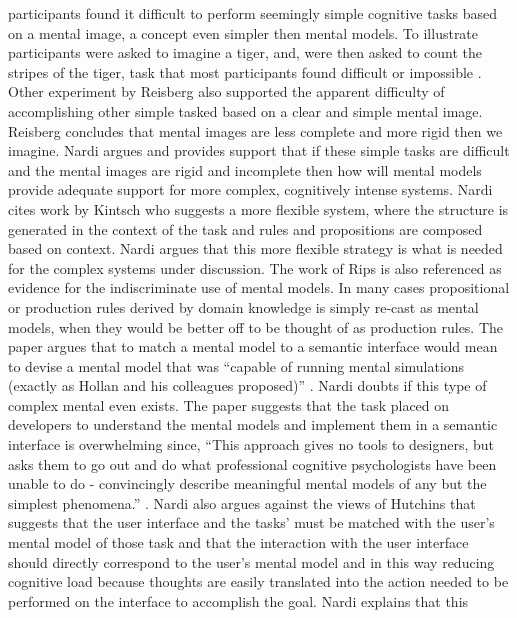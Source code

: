 \documentclass{sig-alternate}
\begin{document}
participants found it difficult to perform seemingly simple cognitive tasks
based on a mental image, a concept even simpler then mental models. To
illustrate participants were asked to imagine a tiger, and, were then asked to
count the stripes of the tiger, task that most participants found difficult or
impossible \cite{Reisberg}.  Other experiment by Reisberg also supported the
apparent difficulty of accomplishing other simple tasked based on a clear and
simple mental image. Reisberg concludes that mental images are less complete and
more rigid then we imagine. Nardi argues and provides support that if these
simple tasks are difficult and the mental images are rigid and incomplete then
how will mental models provide adequate support for more complex, cognitively
intense systems. Nardi cites work by Kintsch
\cite{Kintsch:88:TheRoleOfKnowledge} who suggests a more flexible system, where
the structure is generated in the context of the task and rules and propositions
are composed based on context. Nardi argues that this more flexible strategy is
what is needed for the complex systems under discussion. The work of Rips
\cite{Rips:MentalMuddles} is also referenced as evidence for the indiscriminate
use of mental models. In many cases propositional or production rules derived by
domain knowledge is simply re-cast as mental models, when they would be better
off to be thought of as production rules. The paper argues that to match a
mental model to a semantic interface would mean to devise a mental model that
was ``capable of running mental simulations (exactly as Hollan and his
colleagues proposed)'' \cite{Nardi:BeyondModels}. Nardi doubts if this type of
complex mental even exists. The paper suggests that the task placed on
developers to understand the mental models and implement them in a semantic
interface is overwhelming  since, ``This approach gives no tools to designers,
but asks them to go out and do what professional cognitive psychologists have
been unable to do - convincingly describe meaningful mental models of any but
the simplest phenomena.'' \cite{Nardi:BeyondModels}. Nardi also argues against
the views of Hutchins \cite{Hutchins:1985:DirectManipulationIinterfaces} that
suggests that the user interface and the tasks' must be matched with the user's
mental model of those task and that the interaction with the user interface
should directly correspond to the user's mental model and in this way reducing
cognitive load because thoughts are easily translated into the action needed to
be performed on the interface to accomplish the goal. Nardi explains that this
\end{document}
